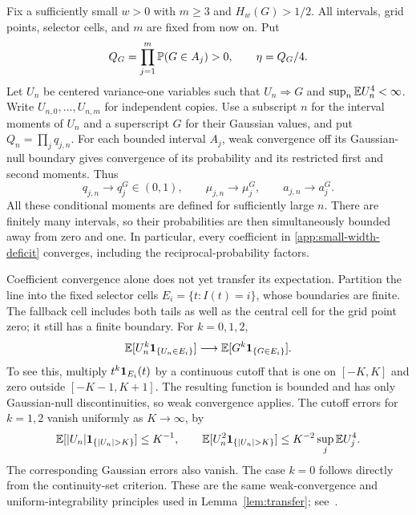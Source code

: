 Fix a sufficiently small $w>0$ with $m\ge3$ and $H_w(G)>1/2$.
All intervals, grid points, selector cells, and $m$ are fixed from
now on.  Put
\[
 Q_G=\prod_{j=1}^m\mathbb P(G\in A_j)>0,\qquad \eta=Q_G/4.
\]
Let $U_n$ be centered variance-one variables such that
$U_n\Rightarrow G$ and $\sup_n\mathbb E U_n^4<\infty$.
Write $U_{n,0},\ldots,U_{n,m}$ for independent copies.  Use a
subscript $n$ for the interval moments of $U_n$ and a superscript $G$
for their Gaussian values, and put $Q_n=\prod_j q_{j,n}$.
For each bounded interval $A_j$, weak convergence off its Gaussian-null
boundary gives convergence of its probability and its restricted
first and second moments.  Thus
\[
 q_{j,n}\to q_j^G\in(0,1),\qquad
 \mu_{j,n}\to\mu_j^G,\qquad a_{j,n}\to a_j^G.
\]
All these conditional moments are defined for sufficiently large $n$.
There are finitely many intervals, so their probabilities are then
simultaneously bounded away from zero and one.  In particular, every
coefficient in \eqref{app:small-width-deficit} converges, including
the reciprocal-probability factors.

Coefficient convergence alone does not yet transfer its expectation.
Partition the line into the fixed selector cells
$E_i=\{t:I(t)=i\}$, whose boundaries are finite.  The fallback cell
includes both tails as well as the central cell for the grid point
zero; it still has a finite boundary.  For $k=0,1,2$,
\begin{equation}\label{app:small-width-restricted-moments}
 \mathbb E[U_n^k\mathbf 1_{\{U_n\in E_i\}}]
 \longrightarrow\mathbb E[G^k\mathbf 1_{\{G\in E_i\}}].
\end{equation}
To see this, multiply $t^k\mathbf 1_{E_i}(t)$ by a continuous cutoff that
is one on $[-K,K]$ and zero outside $[-K-1,K+1]$.  The resulting
function is bounded and has only Gaussian-null discontinuities, so
weak convergence applies.  The cutoff errors for $k=1,2$ vanish
uniformly as $K\to\infty$, by
\[
 \E[|U_n|\one_{\{|U_n|>K\}}]\le K^{-1},\qquad
 \E[U_n^2\one_{\{|U_n|>K\}}]
 \le K^{-2}\sup_j\E U_j^4.
\]
The corresponding Gaussian errors also vanish.  The case $k=0$
follows directly from the continuity-set criterion.  These are the
same weak-convergence and uniform-integrability principles used in
Lemma~\ref{lem:transfer}; see~\cite{Durrett}.

